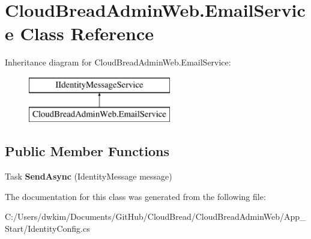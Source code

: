 \hypertarget{a00074}{}\section{Cloud\+Bread\+Admin\+Web.\+Email\+Service Class Reference}
\label{a00074}
Inheritance diagram for Cloud\+Bread\+Admin\+Web.\+Email\+Service\+:\begin{figure}[H]
\begin{center}
\leavevmode
\includegraphics[height=2.000000cm]{a00074}
\end{center}
\end{figure}
\subsection*{Public Member Functions}
\begin{DoxyCompactItemize}
\item 
Task {\bfseries Send\+Async} (Identity\+Message message)\hypertarget{a00074_ae9dfbb932db023912854d32e685f536b}{}\label{a00074_ae9dfbb932db023912854d32e685f536b}

\end{DoxyCompactItemize}


The documentation for this class was generated from the following file\+:\begin{DoxyCompactItemize}
\item 
C\+:/\+Users/dwkim/\+Documents/\+Git\+Hub/\+Cloud\+Bread/\+Cloud\+Bread\+Admin\+Web/\+App\+\_\+\+Start/Identity\+Config.\+cs\end{DoxyCompactItemize}
